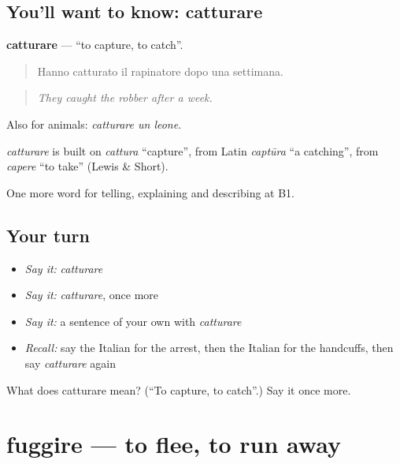 \subsection*{You'll want to know: catturare}
\textbf{catturare} — \textquotedblleft{}to capture, to catch\textquotedblright{}.

\begin{quote}
Hanno catturato il rapinatore dopo una settimana.
\end{quote}

\begin{quote}
\emph{They caught the robber after a week.}
\end{quote}

Also for animals: \emph{catturare un leone}.

\begin{cousinweb}
\emph{catturare} is built on \emph{cattura} \textquotedblleft{}capture\textquotedblright{}, from Latin \emph{captūra} \textquotedblleft{}a catching\textquotedblright{}, from \emph{capere} \textquotedblleft{}to take\textquotedblright{} (Lewis \& Short).
\end{cousinweb}

\begin{grammarlens}[title={What you've built}]
One more word for telling, explaining and describing at B1.
\end{grammarlens}

\subsection*{Your turn}
\begin{itemize}
\raggedright
  \item \emph{Say it:} \emph{catturare}
  \item \emph{Say it:} \emph{catturare}, once more
  \item \emph{Say it:} a sentence of your own with \emph{catturare}
  \item \emph{Recall:} say the Italian for the arrest, then the Italian for the handcuffs, then say \emph{catturare} again
\end{itemize}

\begin{tcolorbox}[breakable,colback=teal!4,colframe=teal!35!black,title={Before you move on}]
What does catturare mean? (\textquotedblleft{}To capture, to catch\textquotedblright{}.) Say it once more.
\end{tcolorbox}
\section[fuggire]{fuggire — to flee, to run away}

